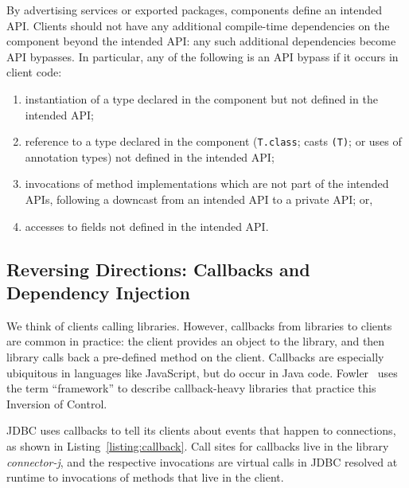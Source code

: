 By advertising services or exported packages, components define an intended API. Clients should not have any additional compile-time dependencies on the component beyond the intended API: any such additional dependencies become API bypasses. In particular, any of the following is an API bypass if it occurs in client code: 

\begin{enumerate}
	\item instantiation of a type declared in the component but not defined in the intended API;
	\item reference to a type declared in the component (\texttt{T.class}; casts \texttt{(T)}; or uses of annotation types) not defined in the intended API;
	\item invocations of method implementations which are not part of the intended APIs, following a downcast from an intended API to a private API; or,
	\item accesses to fields not defined in the intended API.
\end{enumerate}


\subsection{Reversing Directions: Callbacks and Dependency Injection}
We think of clients calling libraries. However, callbacks from libraries to clients are common in practice: the client provides an object to the library, and then library calls back a pre-defined method on the client. Callbacks are especially ubiquitous in languages like JavaScript, but do occur in Java code. Fowler~\cite{fowler05:_inver} uses the term ``framework'' to describe callback-heavy libraries that practice this Inversion of Control.


JDBC uses callbacks to tell its clients about events that happen to connections, as shown in Listing~\ref{listing:callback}. Call sites for callbacks live in the library \textit{connector-j}, and the respective invocations are virtual calls in JDBC resolved at runtime to invocations of methods that live in the client.

